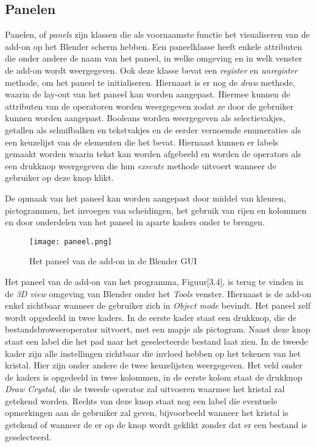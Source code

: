 \subsection{Panelen}
Panelen, of \textit{panels} zijn klassen die als voornaamste functie het visualiseren van de add-on op het Blender scherm hebben. Een paneelklasse heeft enkele attributen die onder andere de naam van het paneel, in welke omgeving en in welk venster de add-on wordt weergegeven. Ook deze klasse bevat een \textit{register} en \textit{unregister} methode, om het paneel te initialiseren. Hiernaast is er nog de \textit{draw} methode, waarin de lay-out van het paneel kan worden aangepast. Hiermee kunnen de attributen van de operatoren worden weergegeven zodat ze door de gebruiker kunnen worden aangepast. Booleans worden weergegeven als selectievakjes, getallen als schuifbalken en tekstvakjes en de eerder vernoemde enumeraties als een keuzelijst van de elementen die het bevat. Hiernaast kunnen er labels gemaakt worden waarin tekst kan worden afgebeeld en worden de operators als een drukknop weergegeven die hun \textit{execute} methode uitvoert wanneer de gebruiker op deze knop klikt.
\par
De opmaak van het paneel kan worden aangepast door middel van kleuren, pictogrammen, het invoegen van scheidingen, het gebruik van rijen en kolommen en door onderdelen van het paneel in aparte kaders onder te brengen.
\par
\begin{figure}[H]
\texttt{[image: paneel.png]}
\caption{Het paneel van de add-on in de Blender GUI}
\end{figure}

\newpage
Het paneel van de add-on van het programma, Figuur[3.4], is terug te vinden in de \textit{3D view} omgeving van Blender onder het \textit{Tools} venster. Hiernaast is de add-on enkel zichtbaar wanneer de gebruiker zich in \textit{Object mode} bevindt. Het paneel zelf wordt opgedeeld in twee kaders. In de eerste kader staat een drukknop, die de bestandsbrowseroperator uitvoert, met een mapje als pictogram. Naast deze knop staat een label die het pad naar het geselecteerde bestand laat zien. In de tweede kader zijn alle instellingen zichtbaar die invloed hebben op het tekenen van het kristal. Hier zijn onder andere de twee keuzelijsten weergegeven.  Het veld onder de kaders is opgedeeld in twee kolommen, in de eerste kolom staat de drukknop \textit{Draw Crystal}, die de tweede operator zal uitvoeren waarmee het kristal zal getekend worden. Rechts van deze knop staat nog een label die eventuele opmerkingen aan de gebruiker zal geven, bijvoorbeeld wanneer het kristal is getekend of wanneer de er op de knop wordt geklikt zonder dat er een bestand is geselecteerd.




